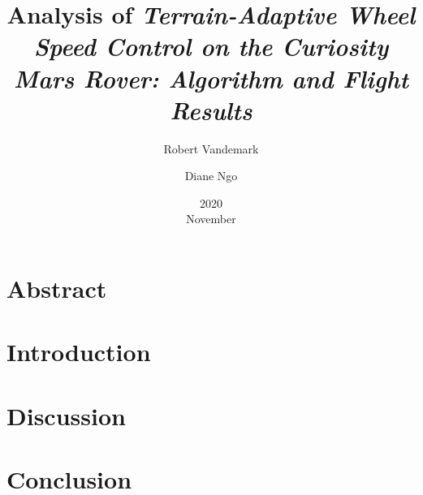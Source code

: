 \documentclass[11pt]{report}
\title{Analysis of \em{Terrain-Adaptive Wheel Speed Control on the Curiosity Mars Rover: Algorithm and Flight Results}}
\date{2020\\ November}
\author{Robert Vandemark \and Diane Ngo}
\begin{document}
	\renewcommand*{\thepage}{\arabic{page}}
	\setcounter{page}{1}
	\maketitle

	\tableofcontents
	\newpage

	\acresetall
	\chapter{Abstract}
	

	\acresetall
	\chapter{Introduction}
	

	\chapter{Discussion}
	

	\acresetall
	\chapter{Conclusion}
	

	\begin{center}
		\printbibliography[heading=bibintoc, title={Bibliography}]
	\end{center}
\end{document}
